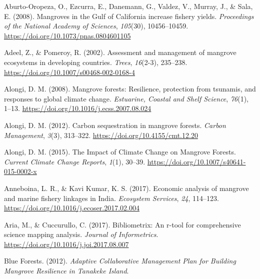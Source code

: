 \documentclass[
  12pt,
]{article}
\newlength{\cslhangindent}
\newlength{\cslentryspacingunit} %
\newenvironment{CSLReferences}[2] %
 {%
  \setlength{\parindent}{0pt}
  \ifodd #1
  \let\oldpar\par
  \def\par{\hangindent=\cslhangindent\oldpar}
  \fi
  \setlength{\parskip}{#2\cslentryspacingunit}
 }%
 {}
\begin{document}
\hypertarget{refs}{}
\begin{CSLReferences}{1}{2}
\leavevmode{}%
Aburto-Oropeza, O., Ezcurra, E., Danemann, G., Valdez, V., Murray, J., \& Sala, E. (2008). Mangroves in the {Gulf} of {California} increase fishery yields. \emph{Proceedings of the National Academy of Sciences}, \emph{105}(30), 10456--10459. \url{https://doi.org/10.1073/pnas.0804601105}

\leavevmode{}%
Adeel, Z., \& Pomeroy, R. (2002). Assessment and management of mangrove ecosystems in developing countries. \emph{Trees}, \emph{16}(2-3), 235--238. \url{https://doi.org/10.1007/s00468-002-0168-4}

\leavevmode{}%
Alongi, D. M. (2008). Mangrove forests: {Resilience}, protection from tsunamis, and responses to global climate change. \emph{Estuarine, Coastal and Shelf Science}, \emph{76}(1), 1--13. \url{https://doi.org/10.1016/j.ecss.2007.08.024}

\leavevmode{}%
Alongi, D. M. (2012). Carbon sequestration in mangrove forests. \emph{Carbon Management}, \emph{3}(3), 313--322. \url{https://doi.org/10.4155/cmt.12.20}

\leavevmode{}%
Alongi, D. M. (2015). The {Impact} of {Climate Change} on {Mangrove Forests}. \emph{Current Climate Change Reports}, \emph{1}(1), 30--39. \url{https://doi.org/10.1007/s40641-015-0002-x}

\leavevmode{}%
Anneboina, L. R., \& Kavi Kumar, K. S. (2017). Economic analysis of mangrove and marine fishery linkages in {India}. \emph{Ecosystem Services}, \emph{24}, 114--123. \url{https://doi.org/10.1016/j.ecoser.2017.02.004}

\leavevmode{}%
Aria, M., \& Cuccurullo, C. (2017). Bibliometrix: An r-tool for comprehensive science mapping analysis. \emph{Journal of Informetrics}. \url{https://doi.org/10.1016/j.joi.2017.08.007}

\leavevmode{}%
Blue Forests. (2012). \emph{Adaptive {Collaborative} {Management} {Plan} for {Building} {Mangrove} {Resilience} in {Tanakeke} {Island}}.


\end{CSLReferences}
\end{document}
